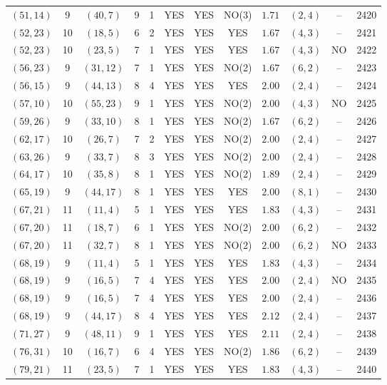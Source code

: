 \begin{longtable}{|c|c|c|c|c|c|c|c|c|c|c|c|}
$(51,14)$ & 9 & $(40,7)$ & 9 & 1 & YES & YES & NO(3) & $1.71$ & $(2,4)$ & -- & 2420\\
$(52,23)$ & 10 & $(18,5)$ & 6 & 2 & YES & YES & YES & $1.67$ & $(4,3)$ & -- & 2421\\
$(52,23)$ & 10 & $(23,5)$ & 7 & 1 & YES & YES & YES & $1.67$ & $(4,3)$ & NO & 2422\\
$(56,23)$ & 9 & $(31,12)$ & 7 & 1 & YES & YES & NO(2) & $1.67$ & $(6,2)$ & -- & 2423\\
$(56,15)$ & 9 & $(44,13)$ & 8 & 4 & YES & YES & YES & $2.00$ & $(2,4)$ & -- & 2424\\
$(57,10)$ & 10 & $(55,23)$ & 9 & 1 & YES & YES & NO(2) & $2.00$ & $(4,3)$ & NO & 2425\\
$(59,26)$ & 9 & $(33,10)$ & 8 & 1 & YES & YES & NO(2) & $1.67$ & $(6,2)$ & -- & 2426\\
$(62,17)$ & 10 & $(26,7)$ & 7 & 2 & YES & YES & NO(2) & $2.00$ & $(2,4)$ & -- & 2427\\
$(63,26)$ & 9 & $(33,7)$ & 8 & 3 & YES & YES & NO(2) & $2.00$ & $(2,4)$ & -- & 2428\\
$(64,17)$ & 10 & $(35,8)$ & 8 & 1 & YES & YES & NO(2) & $1.89$ & $(2,4)$ & -- & 2429\\
$(65,19)$ & 9 & $(44,17)$ & 8 & 1 & YES & YES & YES & $2.00$ & $(8,1)$ & -- & 2430\\
$(67,21)$ & 11 & $(11,4)$ & 5 & 1 & YES & YES & YES & $1.83$ & $(4,3)$ & -- & 2431\\
$(67,20)$ & 11 & $(18,7)$ & 6 & 1 & YES & YES & NO(2) & $2.00$ & $(6,2)$ & -- & 2432\\
$(67,20)$ & 11 & $(32,7)$ & 8 & 1 & YES & YES & NO(2) & $2.00$ & $(6,2)$ & NO & 2433\\
$(68,19)$ & 9 & $(11,4)$ & 5 & 1 & YES & YES & YES & $1.83$ & $(4,3)$ & -- & 2434\\
$(68,19)$ & 9 & $(16,5)$ & 7 & 4 & YES & YES & YES & $2.00$ & $(2,4)$ & NO & 2435\\
$(68,19)$ & 9 & $(16,5)$ & 7 & 4 & YES & YES & YES & $2.00$ & $(2,4)$ & -- & 2436\\
$(68,19)$ & 9 & $(44,17)$ & 8 & 4 & YES & YES & YES & $2.12$ & $(2,4)$ & -- & 2437\\
$(71,27)$ & 9 & $(48,11)$ & 9 & 1 & YES & YES & YES & $2.11$ & $(2,4)$ & -- & 2438\\
$(76,31)$ & 10 & $(16,7)$ & 6 & 4 & YES & YES & NO(2) & $1.86$ & $(6,2)$ & -- & 2439\\
$(79,21)$ & 11 & $(23,5)$ & 7 & 1 & YES & YES & YES & $1.83$ & $(4,3)$ & -- & 2440\\

\end{longtable}
